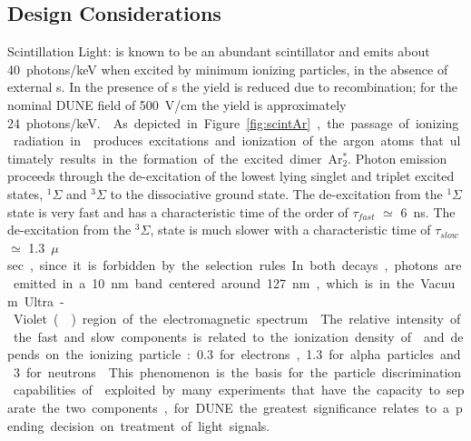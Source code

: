 \subsection{Design Considerations}
\label{sec:fdsp-pd-des-consid}

Scintillation Light: \lar is known to be an abundant scintillator and emits about \SI{40}{photons/keV} when excited  by minimum ionizing particles\cite{Doke:1990rza},
in the absence of external \efield{}s. In the presence of \efield{}s the yield is reduced due to recombination; for the nominal DUNE  field of \SI{500}{V/cm} the yield is approximately \SI{24}{photons/keV.}~\cite{PhysRevB.20.3486}. 

As depicted in Figure~\ref{fig:scintAr}, the passage of ionizing radiation in \lar produces excitations and ionization of the argon atoms that ultimately results in the formation of the excited dimer Ar$^*_2$.  
Photon emission proceeds through the de-excitation of the lowest lying singlet and triplet excited states, $^{1}\Sigma$ and 
$^{3}\Sigma$ to the dissociative ground state. The de-excitation from the $^{1}\Sigma$ state is very fast and has a characteristic time of the order of 
$\tau_{fast}$ $\simeq$ \SI{6}{ns}. The de-excitation from the $^{3}\Sigma$, state is much slower with a characteristic time of $\tau_{slow}$ $\simeq$ \SI{1.3}{$\mu$sec}, since it is forbidden by the selection rules. 
In both decays, photons are emitted in a \SI{10}{nm} band centered around \SI{127}{nm}, which is in the Vacuum Ultra-Violet () region of the electromagnetic spectrum~\cite{Heindl:2010zz}.
The relative intensity of the  fast and slow components is related to the ionization density of \lar and depends on the ionizing particle: \num{0.3} for electrons, \num{1.3} for alpha particles and \num{3} for neutrons~\cite{PhysRevB.27.5279}.
This phenomenon is the basis for the  particle discrimination capabilities of \lar exploited by many experiments that have the capacity to separate the two components, for DUNE the greatest significance relates to a pending decision on treatment of light signals.

